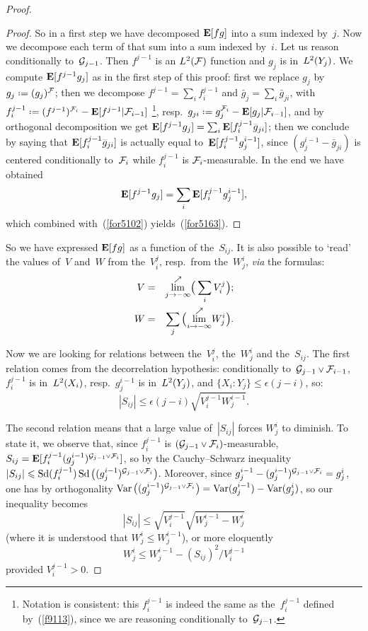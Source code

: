 \begin{proof}
\begin{proof}
So in a first step we have decomposed $\mathop{\smash{\mathbf{E}}}\nolimits[fg]$
into a sum indexed by~$j$. Now we decompose each term of that sum
into a sum indexed by~$i$.
Let us reason conditionally to~$\mathcal{G}_{j-1}$.
Then $f^{j-1}$ is an $\ldb(\mcal{F})$ function
and $g_j$ is in~$\ldb(Y_j)$.
%
We compute $\mathop{\smash{\mathbf{E}}}\nolimits[f^{j-1}g_j]$ as in the first step of this proof:
first we replace $g_j$ by~$\bar{g}_j \coloneqq (g_j)^{\mcal{F}}$;
then we decompose $f^{j-1} = \sum_i f^{j-1}_i$ and $\bar{g}_j = \sum_i \bar{g}_{ji}$,
with $f^{j-1}_i \coloneqq (f^{j-1})^{\mcal{F}_i} - \EE[f^{j-1}|\mcal{F}_{i-1}]$%
%
\footnote{Notation is consistent: this $f^{j-1}_i$ is indeed the same
as the~$f^{j-1}_i$ defined by~(\ref{f9113}),
since we are reasoning conditionally to~$\mathcal{G}_{j-1}$.},
%
resp.\ $\bar{g}_{ji} \coloneqq \bar{g}_j^{\mcal{F}_i} - \EE[\bar{g}_j|\mcal{F}_{i-1}]$,
and by orthogonal decomposition
we get $\EE[f^{j-1}g_j] = \sum_i \EE[f^{j-1}_i\bar{g}_{ji}]$;
then we conclude by saying that $\EE[f^{j-1}_i\bar{g}_{ji}]$
is actually equal to~$\mathop{\smash{\mathbf{E}}}\nolimits[f^{j-1}_ig^{i-1}_j]$,
since $(g^{i-1}_j - \bar{g}_{ji})$ is centered conditionally to~$\mathcal{F}_i$
while $f^{j-1}_i$ is $\mathcal{F}_i$-measurable.
In the end we have obtained
\[\label{for5103} \mathop{\smash{\mathbf{E}}}\nolimits[f^{j-1}g_j] = \sum_i \mathop{\smash{\mathbf{E}}}\nolimits[f^{j-1}_ig^{i-1}_j] ,\]
which combined with~(\ref{for5102}) yields~(\ref{for5163}).
\end{proof}\endgroup

So we have expressed $\mathop{\smash{\mathbf{E}}}\nolimits[fg]$ as a function of the~$S_{ij}$.
It is also possible to `read' the values of~$V$ and~$W$ from the~$V_i^j$,
resp.\ from the~$W_j^i$, \emph{via} the formulas:
\begin{eqnarray}
\label{for0923a} V &=& \overset{\nearrow}{\lim_{j\longto-\infty}} \Big( \sum_i V_i^j \Big) ;\\
\label{for0923b} W &=& \sum_j \Big( \overset{\nearrow}{\lim_{i\longto-\infty}} W_j^i \Big) .
\end{eqnarray}

Now we are looking for relations between the~$V_i^j$, the~$W_j^i$ and the~$S_{ij}$.
The first relation comes from the decorrelation hypothesis:
conditionally to~$\mcal{G}_{j-1} \vee \mcal{F}_{i-1}$,
$f_i^{j-1}$ is in~$\ldb(X_i)$, resp.~$g_j^{i-1}$ is in~$\ldb(Y_j)$,
and ${\{X_i:Y_j\}} \leq \epsilon(j-i)$, so:
\[\label{for9472a} |S_{ij}| \leq \epsilon(j-i) \sqrt{V_i^{j-1}W_j^{i-1}} .\]

The second relation means that a large value of~$|S_{ij}|$ forces $W_j^i$ to diminish.
To state it, we observe that, since $f_i^{j-1}$ is $(\mcal{G}_{j-1}\vee\mcal{F}_i)$-measurable,
$S_{ij} = \EE[f_i^{j-1}(g_j^{i-1})^{\mcal{G}_{j-1}\vee\mcal{F}_i}]$,
so by the Cauchy--Schwarz inequality
$|S_{ij}| \leq \ecty(f_i^{j-1}) \*
\ecty\big( (g_j^{i-1})^{\mcal{G}_{j-1}\vee\mcal{F}_i} \big)$.
Moreover, since $g_j^{i-1} - (g_j^{i-1})^{\mcal{G}_{j-1}\vee\mcal{F}_i} = g_j^i$,
one has by orthogonality $\Var\big( (g_j^{i-1})^{\mcal{G}_{j-1}\vee\mcal{F}_i} \big) =
\Var(g_j^{i-1}) - \Var(g_j^i)$,
so our inequality becomes
\[\label{for9472b} |S_{ij}| \leq \sqrt{V_i^{j-1}}\sqrt{W_j^{i-1}-W_j^i} \]
(where it is understood that $W_j^i \leq W_j^{i-1}$),
or more eloquently
\[\label{for9472b'} W^i_j \leq W^{i-1}_j - (S_{ij})^2/V^{j-1}_i \]
provided $V_i^{j-1} > 0$.


\end{proof}
